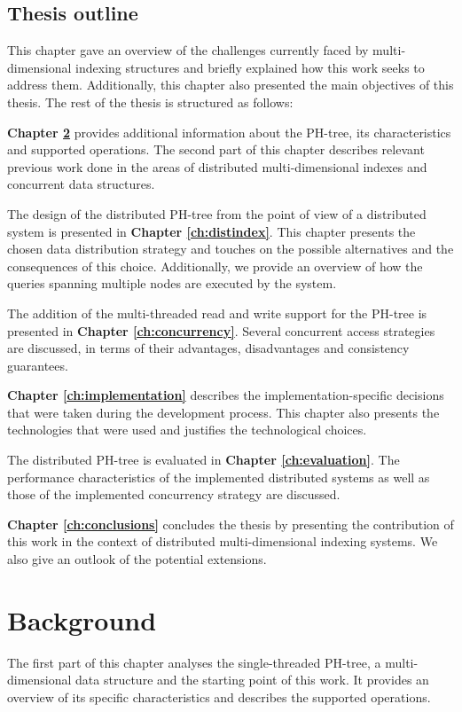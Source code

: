 \documentclass[11pt,a4paper]{globis-book}
\begin{document}
\section{Thesis outline}
\label{sec:intro-outline}

This chapter gave an overview of the challenges currently faced by multi-dimensional indexing structures and briefly explained how this work seeks to address them. Additionally, this chapter also presented the main objectives of this thesis. The rest of the thesis is structured as follows:

\textbf{Chapter \ref{ch:background}} provides additional information about the PH-tree, its characteristics and supported operations. The second part of this chapter describes relevant previous work done in the areas of distributed multi-dimensional indexes and concurrent data structures.

The design of the distributed PH-tree from the point of view of a distributed system is presented in \textbf{Chapter \ref{ch:distindex}}. This chapter presents the chosen data distribution strategy and touches on the possible alternatives and the consequences of this choice. Additionally, we provide an overview of how the queries spanning multiple nodes are executed by the system.

The addition of the multi-threaded read and write support for the PH-tree is presented in \textbf{Chapter \ref{ch:concurrency}}. Several concurrent access strategies are discussed, in terms of their advantages, disadvantages and consistency guarantees.

\textbf{Chapter \ref{ch:implementation}} describes the implementation-specific decisions that were taken during the development process. This chapter also presents the technologies that were used and justifies the technological choices.

The distributed PH-tree is evaluated in \textbf{Chapter \ref{ch:evaluation}}. The performance characteristics of the implemented distributed systems as well as those of the implemented concurrency strategy are discussed.

\textbf{Chapter \ref{ch:conclusions}} concludes the thesis by presenting the contribution of this work in the context of distributed multi-dimensional indexing systems. We also give an outlook of the potential extensions. 

\chapter{Background}
\label{ch:background}
The first part of this chapter analyses the single-threaded PH-tree, a multi-dimensional data structure and the starting point of this work. It provides an overview of its specific characteristics and describes the supported operations.
\end{document}
